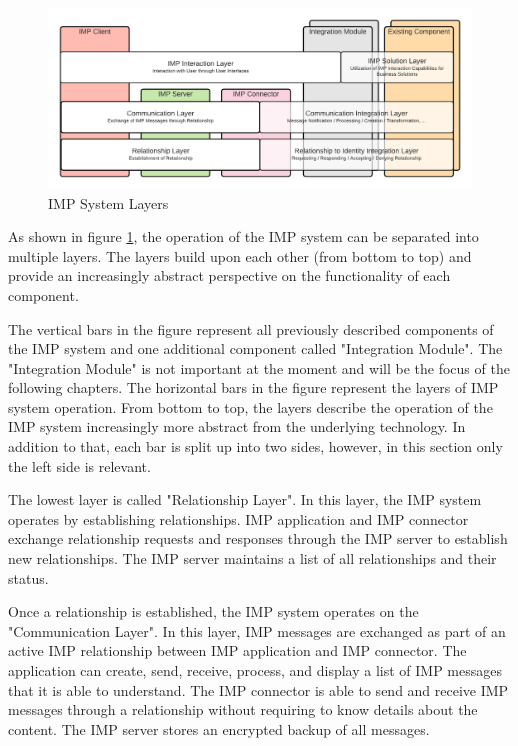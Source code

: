 \begin{figure}[h]
    \centering
    \includegraphics[scale=0.6]{Diagrams/IMP Layer Diagram.pdf}
    \caption{IMP System Layers}
    \label{imp:layer_diagram}
\end{figure}

As shown in figure \ref{imp:layer_diagram}, the operation of the IMP system can be separated into multiple layers. The layers build upon each other (from bottom to top) and provide an increasingly abstract perspective on the functionality of each component. 

The vertical bars in the figure represent all previously described components of the IMP system and one additional component called "Integration Module". The "Integration Module" is not important at the moment and will be the focus of the following chapters. The horizontal bars in the figure represent the layers of IMP system operation. From bottom to top, the layers describe the operation of the IMP system increasingly more abstract from the underlying technology. In addition to that, each bar is split up into two sides, however, in this section only the left side is relevant.

The lowest layer is called "Relationship Layer". In this layer, the IMP system operates by establishing relationships. IMP application and IMP connector exchange relationship requests and responses through the IMP server to establish new relationships. The IMP server maintains a list of all relationships and their status.

Once a relationship is established, the IMP system operates on the "Communication Layer". In this layer, IMP messages are exchanged as part of an active IMP relationship between IMP application and IMP connector. The application can create, send, receive, process, and display a list of IMP messages that it is able to understand. The IMP connector is able to send and receive IMP messages through a relationship without requiring to know details about the content. The IMP server stores an encrypted backup of all messages.

